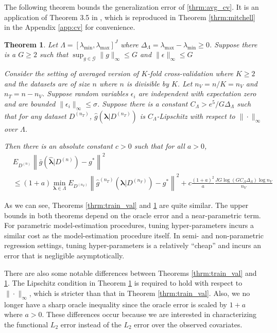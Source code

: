\documentclass[12pt]{article}
\newtheorem{theorem}{Theorem}
\begin{document}
The following theorem bounds the generalization error of \eqref{thrm:avg_cv}. It is an application of Theorem 3.5 in \citet{lecue2012oracle}, which is reproduced in Theorem \ref{thrm:mitchell} in the Appendix \ref{app:cv} for convenience.

\begin{theorem}
	\label{thrm:kfold}
	Let $\Lambda=[\lambda_{\min},\lambda_{\max}]^{J}$ where $\Delta_{\Lambda} = \lambda_{\max} - \lambda_{\min} \ge 0$. Suppose there is a $G \ge  2$ such that $\sup_{g \in \mathcal{G}} \|g\|_\infty \le G$ and $\|\epsilon \|_\infty \le G$
	
	Consider the setting of averaged version of $K$-fold cross-validation where $K \ge 2$ and the datasets are of size $n$ where $n$ is divisible by $K$. Let $n_V = n/K = n_V$ and $n_T = n - n_V$. Suppose random variables $\epsilon_i$ are independent with expectation zero and are bounded $\| \epsilon_i \|_\infty \le \sigma$. Suppose there is a constant $C_\Lambda > e^5/G\Delta_{\Lambda}$ such that for any dataset $D^{(n_T)}$, $\hat g (\boldsymbol{\lambda} | D^{(n_T)})$ is $C_\Lambda$-Lipschitz with respect to $\| \cdot \|_\infty$ over $\Lambda$.
	
	Then there is an absolute constant $c > 0$ such that for all $a > 0$,
	\begin{align*}
	&
	E_{D^{(n)}}
	\left \| \bar{g} ( \hat{\boldsymbol \lambda} | {D^{(n)}} ) - g^* \right \|^2 
	\\
	&\le
	(1+a) \min_{\boldsymbol{\lambda} \in \Lambda}  
	E_{D^{(n_T)}}
	\left \| \hat{g}^{(n_T)}(\boldsymbol \lambda | D^{(n_T)}) - g^* \right \|^2 
	+ c \frac{(1+a)^2}{a} \frac{J G \log (GC_\Lambda \Delta_{\Lambda} ) \log n_V }{n_V} 
	\end{align*}
\end{theorem}

As we can see, Theorems \ref{thrm:train_val} and \ref{thrm:kfold} are quite similar. The upper bounds in both theorems depend on the oracle error and a near-parametric term. For parametric model-estimation procedures, tuning hyper-parameters incurs a similar cost as the model-estimation procedure itself. In semi- and non-parametric regression settings, tuning hyper-parameters is a relatively ``cheap'' and incurs an error that is negligible asymptotically.

There are also some notable differences between Theorems \ref{thrm:train_val} and \ref{thrm:kfold}. The Lipschitz condition in Theorem \ref{thrm:kfold} is required to hold with respect to $\| \cdot \|_\infty$, which is stricter than that in Theorem \ref{thrm:train_val}. Also, we no longer have a sharp oracle inequality since the oracle error is scaled by $1+a$ where $a > 0$. These differences occur because we are interested in characterizing the functional $L_2$ error instead of the $L_2$ error over the observed covariates.
\end{document}
